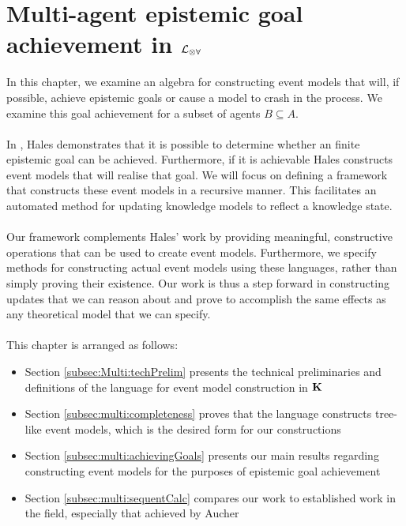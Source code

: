 \section{Multi-agent epistemic goal achievement in $\mathcal{L}_{\otimes\forall}$} \label{chapter:Multiagent}

In this chapter, we examine an algebra for constructing event models that will, if possible, achieve
epistemic goals or cause a model to crash in the process.
We examine this goal achievement for a subset of agents $B \subseteq A$.\\
\\
In \cite{hales13synthesis}, Hales demonstrates that it is possible to determine whether an
finite epistemic goal can be achieved.
Furthermore, if it is achievable Hales constructs event models that will realise
that goal.
We will focus on defining a framework that constructs these event models in a
recursive manner.
This facilitates an automated method for updating knowledge models to reflect a
knowledge state.\\
\\
Our framework complements Hales' work by providing meaningful, constructive operations
that can be used to create event models.
Furthermore, we specify methods for constructing actual event models using these languages, rather
than simply proving their existence.
Our work is thus a step forward in constructing updates that we can reason about and prove to
accomplish the same effects as any theoretical model that we can specify.\\
\\
This chapter is arranged as follows:

\begin{itemize}
	\item Section \ref{subsec:Multi:techPrelim} presents the technical preliminaries and definitions
		of the language for event model construction in $\bf K$
	\item Section \ref{subsec:multi:completeness} proves that the language constructs tree-like event
		models, which is the desired form for our constructions
	\item Section \ref{subsec:multi:achievingGoals} presents our main results regarding constructing
		event models for the purposes of epistemic goal achievement
	\item Section \ref{subsec:multi:sequentCalc} compares our work to established work in the field,
		especially that achieved by Aucher
\end{itemize}

